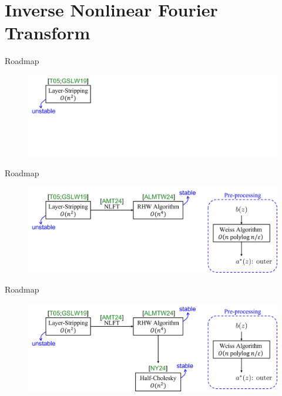\section{Inverse Nonlinear Fourier Transform}
\begin{frame}{Roadmap}
    \begin{figure}
        \centering
        \includegraphics[width=1\linewidth]{figures/roadmap1.png}
    \end{figure}
\end{frame}
\addtocounter{framenumber}{-1}
\begin{frame}{Roadmap}
    \begin{figure}
        \centering
        \includegraphics[width=1\linewidth]{figures/roadmap2.png}
    \end{figure}
\end{frame}
\addtocounter{framenumber}{-1}
\begin{frame}{Roadmap}
    \begin{figure}
        \centering
        \includegraphics[width=1\linewidth]{figures/roadmap3.png}
    \end{figure}
\end{frame}
